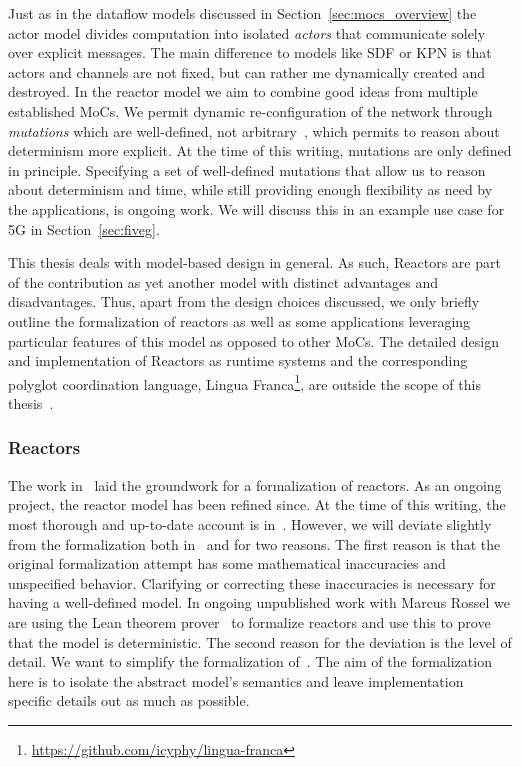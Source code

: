 Just as in the dataflow models discussed in Section~\ref{sec:mocs_overview} the actor model divides computation into isolated \emph{actors} that communicate solely over explicit messages.
The main difference to models like \ac{SDF} or \ac{KPN} is that actors and channels are not fixed, but can rather me dynamically created and destroyed.
In the reactor model we aim to combine good ideas from multiple established \acp{MoC}.
We permit dynamic re-configuration of the network through \emph{mutations} which are well-defined, not arbitrary~\cite{lohstroh_cyphy19}, which permits to reason about determinism more explicit. 
At the time of this writing, mutations are only defined in principle.
Specifying a set of well-defined mutations that allow us to reason about determinism and time, while still providing enough flexibility as need by the applications, is ongoing work.
We will discuss this in an example use case for 5G in Section~\ref{sec:fiveg}.

This thesis deals with model-based design in general.
As such, Reactors are part of the contribution as yet another model with distinct advantages and disadvantages.
Thus, apart from the design choices discussed, we only briefly outline the formalization of reactors as well as some applications leveraging particular features of this model as opposed to other \acp{MoC}.
The detailed design and implementation of Reactors as runtime systems and the corresponding polyglot coordination language, Lingua Franca\footnote{\url{https://github.com/icyphy/lingua-franca}}, are outside the scope of this thesis~\cite{lingua_franca,lohstroh_phdthesis}.

\subsubsection{Reactors}

The work in~\cite{lohstroh_cyphy19} laid the groundwork for a formalization of reactors.
As an ongoing project, the reactor model has been refined since.
At the time of this writing, the most thorough and up-to-date account is in~\cite{lohstroh_phdthesis}.
However, we will deviate slightly from the formalization both in~\cite{lohstroh_cyphy19} and \cite{lohstroh_phdthesis} for two reasons.
The first reason is that the original formalization attempt has some mathematical inaccuracies and unspecified behavior.
Clarifying or correcting these inaccuracies is necessary for having a well-defined model.
In ongoing unpublished work with Marcus Rossel we are using the Lean theorem prover~\cite{lean} to formalize reactors and use this to prove that the model is deterministic.
The second reason for the deviation is the level of detail.
We want to simplify the formalization of~\cite{lohstroh_cyphy19,lohstroh_phdthesis}.
The aim of the formalization here is to isolate the abstract model's semantics and leave implementation specific details out as much as possible.

